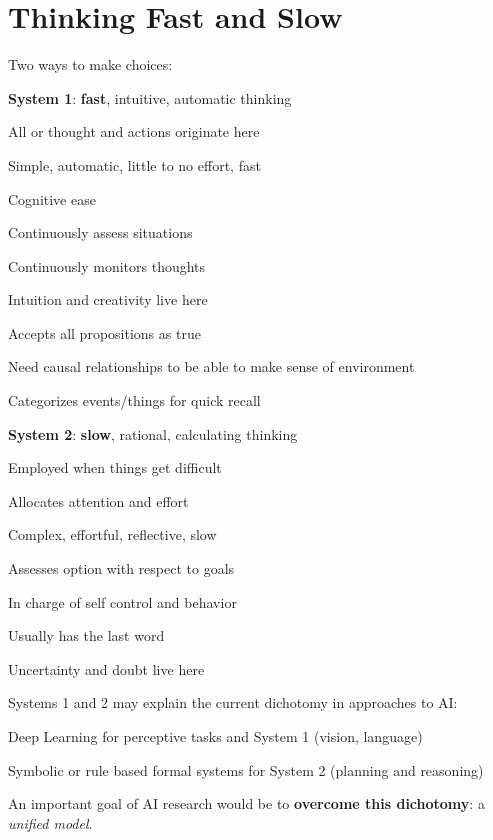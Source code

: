 \documentclass[10pt]{report}
\begin{document}
\section{Thinking Fast and Slow}
Two ways to make choices:
\begin{multicols}{2}
\begin{list}{}{}
	\item \textbf{System 1}: \textbf{fast}, intuitive, automatic thinking
	\begin{list}{}{}
		\item All or thought and actions originate here
		\item Simple, automatic, little to no effort, fast
		\item Cognitive ease
		\item Continuously assess situations
		\item Continuously monitors thoughts
		\item Intuition and creativity live here
		\item Accepts all propositions as true
		\item Need causal relationships to be able to make sense of environment
		\item Categorizes events/things for quick recall
	\end{list}
	\columnbreak
	\item \textbf{System 2}: \textbf{slow}, rational, calculating thinking
	\begin{list}{}{}
		\item Employed when things get difficult
		\item Allocates attention and effort
		\item Complex, effortful, reflective, slow
		\item Assesses option with respect to goals
		\item In charge of self control and behavior
		\item Usually has the last word
		\item Uncertainty and doubt live here
	\end{list}
\end{list}
\end{multicols}
Systems 1 and 2 may explain the current dichotomy in approaches to AI:
\begin{list}{}{}
	\item Deep Learning for perceptive tasks and System 1 (vision, language)
	\item Symbolic or rule based formal systems for System 2 (planning and reasoning)
\end{list}
An important goal of AI research would be to \textbf{overcome this dichotomy}: a \textit{unified model}.
\end{document}
